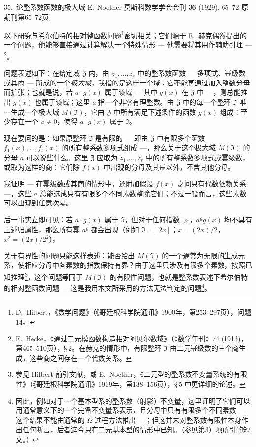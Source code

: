 \begin{noetherpaper}%
{35.~论整系数函数的极大域}%
{E.~Noether}%
{莫斯科数学学会会刊 \textbf{36} (1929), 65--72}%
{原期刊第65--72页}
\end{noetherpaper}

\setcounter{section}{0}

以下研究与希尔伯特的相对整函数问题\footnote{D.\ Hilbert，《数学问题》（《哥廷根科学院通讯》1900年，第253--297页），问题14。}密切相关；它们源于 E.\ 赫克偶然提出的一个问题，他能够直接通过计算解决一个特殊情形 --- 他需要将其用作辅助引理 ---\footnote{E.\ Hecke，《通过二元模函数构造相对阿贝尔数域》（《数学年刊》74 (1913)，第465--510页），\S\,2。在赫克的情形中，有限整环 $\mathfrak{I}$ 由二元幂级数的三个商生成，这些商之间存在一个代数关系。}。

问题表述如下：在给定域 $\mathfrak{Z}$ 内，由 $z_1,\ldots,z_r$ 中的整系数函数 --- 多项式、幂级数或其商 --- 所成的一个\textit{极大域}，我指的是这样一个域：它不能再通过加入整数分母而扩张；也就是说，若 $a \cdot g(x)$ 属于该域 --- 其中 $g(x)$ 在 $\mathfrak{Z}$ 中 ---，则总能推出 $g(x)$ 也属于该域；这里 $a$ 指一个非零有理整数。由 $\mathfrak{Z}$ 中的每一个整环 $\mathfrak{I}$ 唯一生成一个极大域 $M(\mathfrak{I})$，它由 $\mathfrak{Z}$ 中所有满足下述条件的函数 $g(x)$ 组成：至少存在一个 $a \neq 0$，使得 $a \cdot g(x)$ 属于 $\mathfrak{I}$。

现在要问的是：如果原整环 $\mathfrak{I}$ 是有限的 --- 即由 $\mathfrak{Z}$ 中有限多个函数 $f_1(x),\ldots,f_t(x)$ 的所有整系数多项式组成 ---，那么关于这个极大域 $M(\mathfrak{I})$ 的分母 $a$ 可以说些什么。这里 $\mathfrak{Z}$ 应取为 $z_1,\ldots,z_r$ 中的所有整系数多项式或幂级数，或取为这样的商：它们除 $f(x)$ 中出现的分母及其幂以外，不含其他分母。

我证明 --- 在幂级数或其商的情形中，还附加假设 $f(x)$ 之间只有代数依赖关系 ---，这些 $a$ 总能选成只有有限多个不同素数整除它们；不过一般而言，这些素数可以出现到任意次幂。

后一事实立即可见：若 $a \cdot g(x)$ 属于 $\mathfrak{I}$，但对于任何指数 $\varrho$，$a^\varrho g(x)$ 均不具有上述归属性，那么所有幂 $a^\varrho$ 都会出现（例如 $\mathfrak{I} = [2x]$；$x = (2x)/2$，$x^2 = (2x)/2^2$）。

关于有界性的问题只能这样表述：能否给出 $M(\mathfrak{I})$ 的一个通常为无限的生成元系，使相应分母中各素数的指数保持有界？由于这里只涉及有限多个素数，按照已知推理\footnote{参见 Hilbert 前引文献，或 E.\ Noether，《二元型的整系数不变量系统的有限性》（《哥廷根科学院通讯》1919年，第138--156页），\S\,5 中更详细的论述。}，这个问题等同于 $M(\mathfrak{I})$ 的有限性问题，也就是整系数表述下希尔伯特的相对整函数问题 --- 这是我用本文所采用的方法无法判定的问题\footnote{因此，例如对于一个基本型系的整系数（射影）不变量，这里证明了它们可以用通常意义下的一个完备不变量系表示，且分母中只有有限多个不同素数 --- 这个结果不能由通常的 $\Omega$-过程方法推出 ---；但这并未对整系数有限性本身作出任何断言，后者迄今只在二元基本型的情形中已知。（参见第3）项所引的短文。）}。

